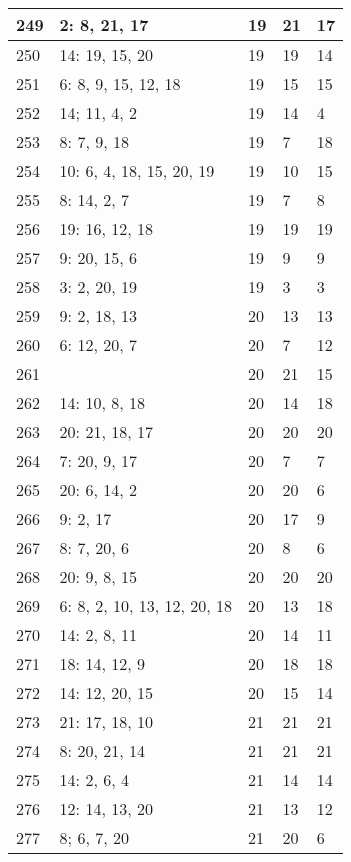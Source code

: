 \documentclass{article} %
\begin{document}
\begin{longtable}{| l | l | l | l | l |}
        249 & 2: 8, 21, 17 & 19 & 21 & 17 \\ \hline
        250 & 14: 19, 15, 20 & 19 & 19 & 14 \\ \hline
        251 & 6: 8, 9, 15, 12, 18 & 19 & 15 & 15 \\ \hline
        252 & 14; 11, 4, 2 & 19 & 14 & 4 \\ \hline
        253 & 8: 7, 9, 18 & 19 & 7 & 18 \\ \hline
        254 & 10: 6, 4, 18, 15, 20, 19 & 19 & 10 & 15 \\ \hline
        255 & 8: 14, 2, 7 & 19 & 7 & 8 \\ \hline
        256 & 19: 16, 12, 18 & 19 & 19 & 19 \\ \hline
        257 & 9: 20, 15, 6 & 19 & 9 & 9 \\ \hline
        258 & 3: 2, 20, 19 & 19 & 3 & 3 \\ \hline
        259 & 9: 2, 18, 13 & 20 & 13 & 13 \\ \hline
        260 & 6: 12, 20, 7 & 20 & 7 & 12 \\ \hline
        261 &  & 20 & 21 & 15 \\ \hline
        262 & 14: 10, 8, 18 & 20 & 14 & 18 \\ \hline
        263 & 20: 21, 18, 17 & 20 & 20 & 20 \\ \hline
        264 & 7: 20, 9, 17 & 20 & 7 & 7 \\ \hline
        265 & 20: 6, 14, 2 & 20 & 20 & 6 \\ \hline
        266 & 9: 2, 17 & 20 & 17 & 9 \\ \hline
        267 & 8: 7, 20, 6 & 20 & 8 & 6 \\ \hline
        268 & 20: 9, 8, 15 & 20 & 20 & 20 \\ \hline
        269 & 6: 8, 2, 10, 13, 12, 20, 18 & 20 & 13 & 18 \\ \hline
        270 & 14: 2, 8, 11 & 20 & 14 & 11 \\ \hline
        271 & 18: 14, 12, 9 & 20 & 18 & 18 \\ \hline
        272 & 14: 12, 20, 15 & 20 & 15 & 14 \\ \hline
        273 & 21: 17, 18, 10 & 21 & 21 & 21 \\ \hline
        274 & 8: 20, 21, 14 & 21 & 21 & 21 \\ \hline
        275 & 14: 2, 6, 4 & 21 & 14 & 14 \\ \hline
        276 & 12: 14, 13, 20 & 21 & 13 & 12 \\ \hline
        277 & 8; 6, 7, 20 & 21 & 20 & 6 \\ \hline

\end{longtable}
\end{document}
